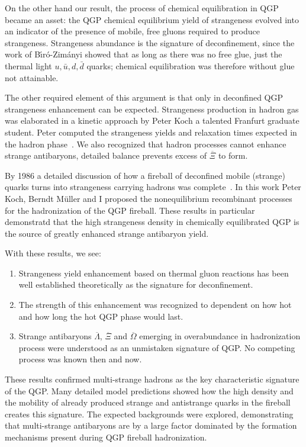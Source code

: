 On the other hand our result, the process of chemical equilibration in QGP became an asset: the QGP chemical equilibrium yield of strangeness evolved into an indicator of the presence of mobile, free gluons required to produce strangeness. Strangeness abundance is the signature of deconfinement, since the work of B\'{\i}r\'o-Zim\'anyi showed that as long as there was no free glue, just the thermal light $u,\bar u, d, \bar d$ quarks; chemical equilibration was therefore without glue not attainable. 

The other required element of this argument is that only in deconfined QGP strangeness enhancement can be expected. Strangeness production in hadron gas was elaborated in a kinetic approach by Peter Koch a talented Franfurt graduate student. Peter computed the strangeness yields and relaxation times expected in the hadron phase~\cite{Koch:1984tz}. We also recognized that hadron processes cannot enhance strange antibaryons, detailed balance prevents excess of $\overline\Xi$ to form. 

By 1986 a detailed discussion of how a fireball of deconfined mobile (strange) quarks turns into strangeness carrying hadrons was complete~\cite{Koch:1986ud}. In this work Peter Koch, Berndt M\"uller and I proposed the nonequilibrium recombinant processes for the hadronization of the QGP fireball. These results in particular demonstratd that the high strangeness density in chemically equilibrated QGP is the source of greatly enhanced strange antibaryon yield.

With these results, we see: 
\begin{enumerate}
\item
Strangeness yield enhancement based on thermal gluon reactions has been well established theoretically as the signature for deconfinement. 
\item
The strength of this enhancement was recognized to dependent on how hot and how long the hot QGP phase would last. 
\item 
Strange antibaryons $\overline\Lambda$, $\overline\Xi$ and $\overline\Omega$ emerging in overabundance in hadronization process were understood as an unmistaken signature of QGP. No competing process was known then and now.
\end{enumerate}


These results confirmed multi-strange hadrons as the key characteristic signature of the QGP. Many detailed model predictions showed how the high density and the mobility of already produced strange and antistrange quarks in the fireball creates this signature. The expected backgrounds were explored, demonstrating that multi-strange antibaryons are by a large factor dominated by the formation mechanisms present during QGP fireball hadronization. 
 

